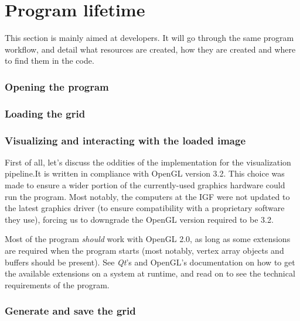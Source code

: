 \section{Program lifetime}\label{text:02_program_flow:02_object_lifetime}
{
	This section is mainly aimed at developers. It will go through the same program workflow, and detail what resources are created, how they are created and where to find them in the code.

	\subsubsection{Opening the program}
	{
	}

	\subsubsection{Loading the grid}
	{
	}

	\subsubsection{Visualizing and interacting with the loaded image}
	{
		First of all, let's discuss the oddities of the implementation for the visualization pipeline.It is written in compliance with OpenGL version 3.2. This choice was made to ensure a wider portion of the currently-used graphics hardware could run the program. Most notably, the computers at the IGF were not updated to the latest graphics driver (to ensure compatibility with a proprietary software they use), forcing us to downgrade the OpenGL version required to be 3.2.\par
		Most of the program \textit{should} work with OpenGL 2.0, as long as some extensions are required when the program starts (most notably, vertex array objects and buffers should be present). See \textit{Qt}'s and OpenGL's documentation on how to get the available extensions on a system at runtime, and read on to see the technical requirements of the program.

	}

	\subsubsection{Generate and save the grid}
	{
	}
}

